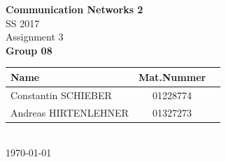 \documentclass[parskip=full]{scrartcl}
\begin{document}
\begin{titlepage}
    \centering
    \vspace*{2cm}
    {\Huge \textbf{Communication Networks 2}}\\
    SS 2017\\
    \vspace*{1cm}
    {\Large Assignment 3}
    \\\vspace*{3cm}
    {\Large \textbf{Group 08}}\\
    \vspace*{1cm}
    {\large 
        \begin{tabular}{l c c}
            Name & Mat.Nummer \\ \hline
            Constantin SCHIEBER & 01228774 \\
            Andreas HIRTENLEHNER & 01327273
        \end{tabular}
    }
    \\\vspace*{7cm}
    \today
\end{titlepage}

\end{document}
